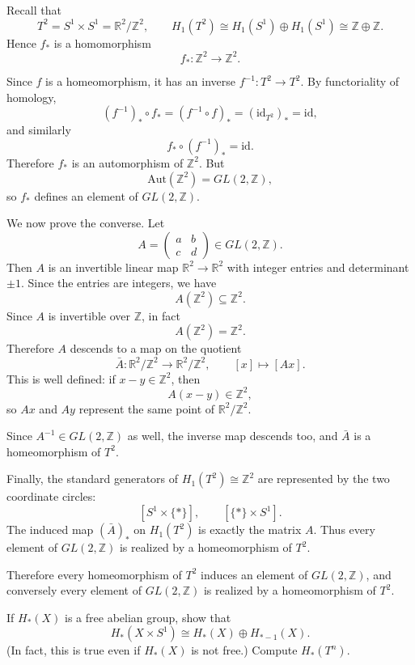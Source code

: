 \begin{solution}
Recall that
\[
T^2=S^1\times S^1=\mathbb R^2/\mathbb Z^2,
\qquad
H_1(T^2)\cong H_1(S^1)\oplus H_1(S^1)\cong \mathbb Z\oplus \mathbb Z.
\]
Hence \(f_*\) is a homomorphism
\[
f_*:\mathbb Z^2\to \mathbb Z^2.
\]

Since \(f\) is a homeomorphism, it has an inverse \(f^{-1}:T^2\to T^2\). By functoriality of homology,
\[
(f^{-1})_*\circ f_*=(f^{-1}\circ f)_*=(\mathrm{id}_{T^2})_*=\mathrm{id},
\]
and similarly
\[
f_*\circ (f^{-1})_*=\mathrm{id}.
\]
Therefore \(f_*\) is an automorphism of \(\mathbb Z^2\). But
\[
\mathrm{Aut}(\mathbb Z^2)=GL(2,\mathbb Z),
\]
so \(f_*\) defines an element of \(GL(2,\mathbb Z)\).

We now prove the converse. Let
\[
A=\begin{pmatrix}a&b\\ c&d\end{pmatrix}\in GL(2,\mathbb Z).
\]
Then \(A\) is an invertible linear map \(\mathbb R^2\to \mathbb R^2\) with integer entries and determinant \(\pm 1\). Since the entries are integers, we have
\[
A(\mathbb Z^2)\subseteq \mathbb Z^2.
\]
Since \(A\) is invertible over \(\mathbb Z\), in fact
\[
A(\mathbb Z^2)=\mathbb Z^2.
\]
Therefore \(A\) descends to a map on the quotient
\[
\bar A:\mathbb R^2/\mathbb Z^2\to \mathbb R^2/\mathbb Z^2,
\qquad
[x]\mapsto [Ax].
\]
This is well defined: if \(x-y\in \mathbb Z^2\), then
\[
A(x-y)\in \mathbb Z^2,
\]
so \(Ax\) and \(Ay\) represent the same point of \(\mathbb R^2/\mathbb Z^2\).

Since \(A^{-1}\in GL(2,\mathbb Z)\) as well, the inverse map descends too, and \(\bar A\) is a homeomorphism of \(T^2\).

Finally, the standard generators of \(H_1(T^2)\cong \mathbb Z^2\) are represented by the two coordinate circles:
\[
[S^1\times \{*\}],\qquad [\{*\}\times S^1].
\]
The induced map \((\bar A)_*\) on \(H_1(T^2)\) is exactly the matrix \(A\). Thus every element of \(GL(2,\mathbb Z)\) is realized by a homeomorphism of \(T^2\).

\par

Therefore every homeomorphism of \(T^2\) induces an element of
\(GL(2,\mathbb Z)\), and conversely every element of \(GL(2,\mathbb Z)\)
is realized by a homeomorphism of \(T^2\).
\end{solution}

\begin{problem}
If \(H_*(X)\) is a free abelian group, show that
\[
H_*(X\times S^1)\cong H_*(X)\oplus H_{*-1}(X).
\]
(In fact, this is true even if \(H_*(X)\) is not free.) Compute \(H_*(T^n)\).

\par
\end{problem}

